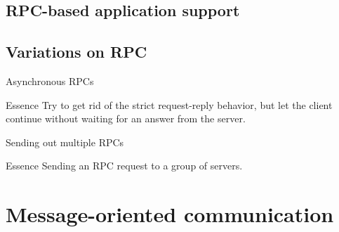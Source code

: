 \subsection{RPC-based application support}
\subsection{Variations on RPC}
\begin{slide}{Asynchronous RPCs}
  \begin{block}{Essence} 
    Try to get rid of the strict request-reply behavior, but let the client continue without waiting for an
    answer from the server.
  \end{block}
  \begin{block}{}
    \begin{center}
    \end{center}
  \end{block}
\end{slide}
\begin{slide}{Sending out multiple RPCs}
  \begin{block}{Essence}
    Sending an RPC request to a group of servers.
  \end{block}
  \begin{block}{}
    \begin{center}
    \end{center}
  \end{block}
\end{slide}
\section{Message-oriented communication}
